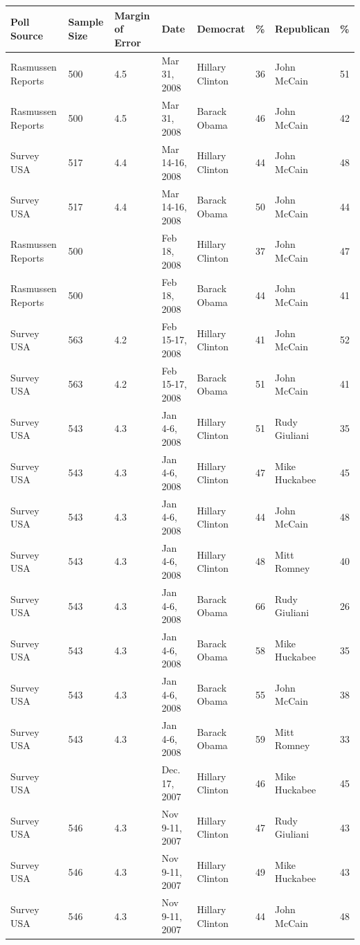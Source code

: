 \documentclass{article}
\begin{document}
\begin{tabular}{llllllll}
\toprule
Poll Source & Sample Size & Margin of Error & Date & Democrat & \% & Republican & \% \\
\midrule
Rasmussen Reports & 500 & 4.5 & Mar 31, 2008 & Hillary Clinton & 36 & John McCain & 51 \\
Rasmussen Reports & 500 & 4.5 & Mar 31, 2008 & Barack Obama & 46 & John McCain & 42 \\
Survey USA & 517 & 4.4 & Mar 14-16, 2008 & Hillary Clinton & 44 & John McCain & 48 \\
Survey USA & 517 & 4.4 & Mar 14-16, 2008 & Barack Obama & 50 & John McCain & 44 \\
Rasmussen Reports & 500 &  & Feb 18, 2008 & Hillary Clinton & 37 & John McCain & 47 \\
Rasmussen Reports & 500 &  & Feb 18, 2008 & Barack Obama & 44 & John McCain & 41 \\
Survey USA & 563 & 4.2 & Feb 15-17, 2008 & Hillary Clinton & 41 & John McCain & 52 \\
Survey USA & 563 & 4.2 & Feb 15-17, 2008 & Barack Obama & 51 & John McCain & 41 \\
Survey USA & 543 & 4.3 & Jan 4-6, 2008 & Hillary Clinton & 51 & Rudy Giuliani & 35 \\
Survey USA & 543 & 4.3 & Jan 4-6, 2008 & Hillary Clinton & 47 & Mike Huckabee & 45 \\
Survey USA & 543 & 4.3 & Jan 4-6, 2008 & Hillary Clinton & 44 & John McCain & 48 \\
Survey USA & 543 & 4.3 & Jan 4-6, 2008 & Hillary Clinton & 48 & Mitt Romney & 40 \\
Survey USA & 543 & 4.3 & Jan 4-6, 2008 & Barack Obama & 66 & Rudy Giuliani & 26 \\
Survey USA & 543 & 4.3 & Jan 4-6, 2008 & Barack Obama & 58 & Mike Huckabee & 35 \\
Survey USA & 543 & 4.3 & Jan 4-6, 2008 & Barack Obama & 55 & John McCain & 38 \\
Survey USA & 543 & 4.3 & Jan 4-6, 2008 & Barack Obama & 59 & Mitt Romney & 33 \\
Survey USA &  &  & Dec. 17, 2007 & Hillary Clinton & 46 & Mike Huckabee & 45 \\
Survey USA & 546 & 4.3 & Nov 9-11, 2007 & Hillary Clinton & 47 & Rudy Giuliani & 43 \\
Survey USA & 546 & 4.3 & Nov 9-11, 2007 & Hillary Clinton & 49 & Mike Huckabee & 43 \\
Survey USA & 546 & 4.3 & Nov 9-11, 2007 & Hillary Clinton & 44 & John McCain & 48 \\

\end{tabular}
\end{document}
